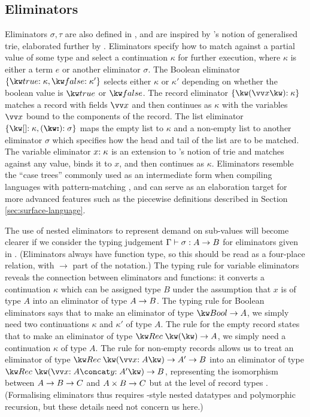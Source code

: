 \subsection{Eliminators}
\label{sec:core-language:syntax-eliminator}
Eliminators $\sigma, \tau$ are also defined in , and are inspired by \citeauthor{connelly95}'s notion of generalised trie, elaborated further by \citet{hinze00}. Eliminators specify how to match against a partial value of some type and select a continuation $\kappa$ for further execution, where $\kappa$ is either a term $e$ or another eliminator $\sigma$. The Boolean eliminator $\elimBool{\kappa}{\kappa'}$ selects either $\kappa$ or $\kappa'$ depending on whether the boolean value is $\exTrue$ or $\exFalse$. The record eliminator $\elimRec{\seq{x}}{\kappa}$ matches a record with fields $\seq{x}$ and then continues as $\kappa$ with the variables $\seq{x}$ bound to the components of the record. The list eliminator $\elimList{\kappa}{\sigma}$ maps the empty list to $\kappa$ and a non-empty list to another eliminator $\sigma$ which specifies how the head and tail of the list are to be matched. The variable eliminator ${x}{:}\;{\kappa}$ is an extension to \citeauthor{connelly95}'s notion of trie and matches against any value, binds it to $x$, and then continues as $\kappa$. Eliminators resemble the ``case trees'' commonly used as an intermediate form when compiling languages with pattern-matching \cite{graf20}, and can serve as an elaboration target for more advanced features such as the piecewise definitions described in Section \ref{sec:surface-language}.

The use of nested eliminators to represent demand on sub-values will become clearer if we consider the typing judgement $\Gamma \vdash \sigma: {A}\rightarrow{B}$ for eliminators given in . (Eliminators always have function type, so this should be read as a four-place relation, with $\to$ part of the notation.) The typing rule for variable eliminators reveals the connection between eliminators and functions: it converts a continuation $\kappa$ which can be assigned type $B$ under the assumption that $x$ is of type $A$ into an eliminator of type ${A}\rightarrow{B}$. The typing rule for Boolean eliminators says that to make an eliminator of type $\tyFun{\tyBool}{A}$, we simply need two continuations $\kappa$ and $\kappa'$ of type $A$. The rule for the empty record states that to make an eliminator of type $\tyFun{\tyRec{}}{A}$, we simply need a continuation $\kappa$ of type $A$. The rule for non-empty records allows us to treat an eliminator of type $\tyFun{\tyRec{\vec{\bind{x}{A}}}}{\tyFun{A'}{B}}$ into an eliminator of type $\tyFun{\tyRec{\vec{\bind{x}{A}} \concat \bind{y}{A'}}}{B}$, representing the isomorphism between ${{A}\rightarrow{B}}\rightarrow{C}$ and ${{A}\times{B}}\rightarrow{C}$ but at the level of record types \cite{hinze00}. (Formalising eliminators thus requires \citeauthor{bird98}-style nested datatypes \cite{bird98} and polymorphic recursion, but these details need not concern us here.)

